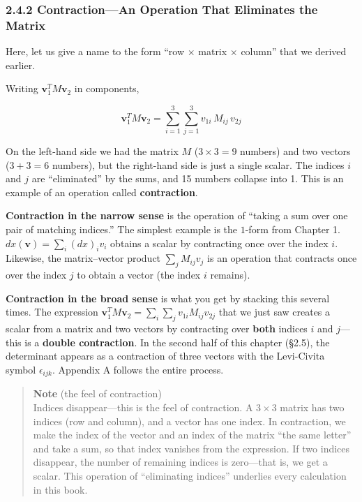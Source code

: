 \documentclass[a4paper,12pt,openany]{book}
\begin{document}
\hypertarget{contractionan-operation-that-eliminates-the-matrix}{%
\subsubsection{2.4.2 Contraction—An Operation That Eliminates the
Matrix}\label{contractionan-operation-that-eliminates-the-matrix}}

Here, let us give a name to the form ``row \(\times\) matrix \(\times\)
column'' that we derived earlier.

Writing \(\mathbf{v}_1^T M \mathbf{v}_2\) in components,

\[
\mathbf{v}_1^T M \mathbf{v}_2 = \sum_{i=1}^3 \sum_{j=1}^3 v_{1i}\, M_{ij}\, v_{2j}
\]

On the left-hand side we had the matrix \(M\) (\(3 \times 3 = 9\)
numbers) and two vectors (\(3+3=6\) numbers), but the right-hand side is
just a single scalar. The indices \(i\) and \(j\) are ``eliminated'' by
the sums, and 15 numbers collapse into 1. This is an example of an
operation called \textbf{contraction}.

\textbf{Contraction in the narrow sense} is the operation of ``taking a
sum over one pair of matching indices.'' The simplest example is the
\(1\)-form from Chapter 1. \(dx(\mathbf{v}) = \sum_i (dx)_i v_i\)
obtains a scalar by contracting once over the index \(i\). Likewise, the
matrix–vector product \(\sum_j M_{ij} v_j\) is an operation that
contracts once over the index \(j\) to obtain a vector (the index \(i\)
remains).

\textbf{Contraction in the broad sense} is what you get by stacking this
several times. The expression
\(\mathbf{v}_1^T M \mathbf{v}_2 = \sum_i \sum_j v_{1i} M_{ij} v_{2j}\)
that we just saw creates a scalar from a matrix and two vectors by
contracting over \textbf{both} indices \(i\) and \(j\)—this is a
\textbf{double contraction}. In the second half of this chapter (§2.5),
the determinant appears as a contraction of three vectors with the
Levi-Civita symbol \(\epsilon_{ijk}\). Appendix A follows the entire
process.

\begin{quote}
\textbf{Note} (the feel of contraction)\\
Indices disappear—this is the feel of contraction. A \(3 \times 3\)
matrix has two indices (row and column), and a vector has one index. In
contraction, we make the index of the vector and an index of the matrix
``the same letter'' and take a sum, so that index vanishes from the
expression. If two indices disappear, the number of remaining indices is
zero—that is, we get a scalar. This operation of ``eliminating
indices'' underlies every calculation in this book.
\end{quote}
\end{document}
